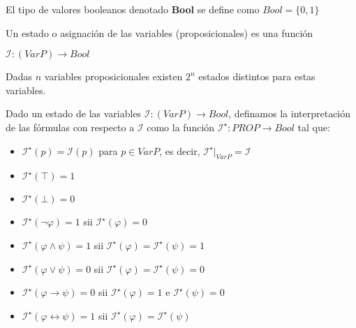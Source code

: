 \documentclass[letterpaper,11pt]{article}
\begin{document}
    \begin{teo} 
        El tipo de valores booleanos denotado \textbf{Bool} se define
        como $Bool = \{0, 1 \}$
    \end{teo}
    
    \begin{teo}
        Un estado o asignación de las variables (proposicionales) es una 
        función 

        \begin{center}
            $\mathcal{I} : (Var P) \rightarrow Bool$
        \end{center}
        
        Dadas $n$ variables proposicionales existen $2^{n}$ estados 
        distintos para estas variables.
    \end{teo}
    
    \begin{teo}
        Dado un estado de las variables 
        $\mathcal{I} : (Var P) \rightarrow Bool$, definamos la interpretación
        de las fórmulas con respecto a $\mathcal{I}$ como la función 
        $\mathcal{I^{\star}} : PROP \rightarrow Bool$ tal que: 
        
        \begin{itemize}
            \item $\mathcal{I^{\star}}(p) = \mathcal{I}(p)$ para 
            $p \in Var P$, es decir, 
            $\mathcal{I^{\star}}|_{Var P} = \mathcal{I}$
            \item $\mathcal{I^{\star}}(\top) = 1$
            \item $\mathcal{I^{\star}}(\bot) = 0$
            \item $\mathcal{I^{\star}}(\neg \varphi) = 1$ sii 
            $\mathcal{I^{\star}}(\varphi) = 0$
            \item $\mathcal{I^{\star}}(\varphi \land \psi) = 1$
            sii $\mathcal{I^{\star}}(\varphi) = \mathcal{I^{\star}}(\psi) = 1$
            \item $\mathcal{I^{\star}}(\varphi \lor \psi) = 0$
            sii $\mathcal{I^{\star}}(\varphi) = 
            \mathcal{I^{\star}}(\psi) = 0$
            \item $\mathcal{I^{\star}}(\varphi \rightarrow \psi) = 0$
            sii $\mathcal{I^{\star}}(\varphi) = 1$ e
            $\mathcal{I^{\star}}(\psi) = 0$
            \item $\mathcal{I^{\star}}(\varphi \leftrightarrow \psi) = 1$
            sii $\mathcal{I^{\star}}(\varphi) = \mathcal{I^{\star}}(\psi)$
        \end{itemize}
    \end{teo}
\end{document}
